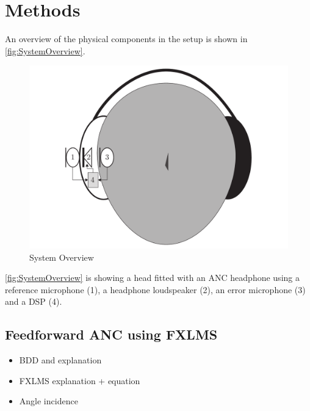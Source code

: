 

\section{Methods}
An overview of the physical components in the setup is shown in \autoref{fig:SystemOverview}.
\begin{figure}[H]
	\centering
	\includegraphics[width=1\columnwidth]{figures/ArticleIllustrations/SystemOverview}
	\caption{System Overview}
	\label{fig:SystemOverview}
\end{figure}
\autoref{fig:SystemOverview} is showing a head fitted with an ANC headphone using a reference microphone (1), a headphone loudspeaker (2), an error microphone (3) and a DSP (4).  

\subsection*{Feedforward ANC using FXLMS}

\begin{itemize}
\item BDD and explanation
\item FXLMS explanation + equation
\item Angle incidence 
\end{itemize}

